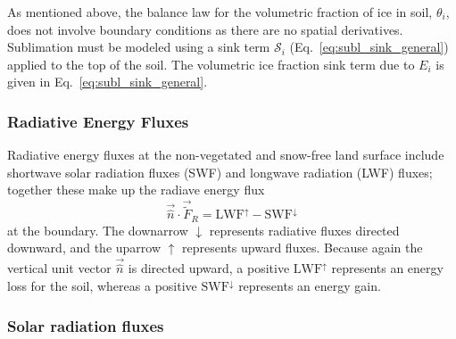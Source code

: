 \documentclass[twoside,10pt]{report}
\begin{document}
As mentioned above, the balance law for the volumetric fraction of ice in soil, $\theta_i$, does not involve boundary conditions as there are no spatial derivatives. Sublimation must be modeled using a sink term $\mathcal{S}_i$ (Eq.~\eqref{eq:subl_sink_general}) applied to the top of the soil. The volumetric ice fraction sink term due to $E_i$ is given in Eq.~\eqref{eq:subl_sink_general}.

\subsubsection{Radiative Energy Fluxes}

Radiative energy fluxes at the non-vegetated and snow-free land surface include shortwave solar radiation fluxes (SWF) and longwave radiation (LWF) fluxes; together these make up the radiave energy flux 
\[
\vec{\hat n} \cdot \vec{\tilde F}_R = \mathrm{LWF}^\uparrow-\mathrm{SWF}^\downarrow
\]
at the boundary. The downarrow ${\downarrow}$ represents radiative fluxes directed downward, and the uparrow $\uparrow$ represents upward fluxes. Because again the vertical unit vector $\vec{\hat n}$ is directed upward, a positive $\mathrm{LWF}^\uparrow$ represents an energy loss for the soil, whereas a positive $\mathrm{SWF}^\downarrow$ represents an energy gain.


\subsubsection{Solar radiation fluxes}
\end{document}
